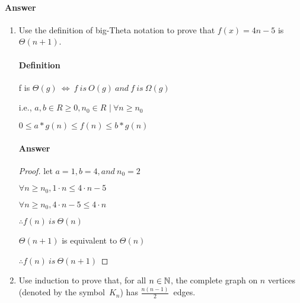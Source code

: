 \documentclass{article}
\begin{document}
\paragraph{Answer}
\todo{}

\collab{\todo{}}

\begin{enumerate}

	\item Use the definition of big-Theta notation to prove that $f(x)=4n-5$
	      is $\Theta(n+1)$.
	      
	      \paragraph{Definition}
	      f is $\Theta(g)\ \iff\ f\ is\ O(g)\ and\ f\ is\ \Omega(g)$
	      
	      i.e., $ a, b \in R \geq 0, n_{0} \in R$
	      $|\ \forall n \geq n_0$
	      
	      $0 \leq a* g(n) \leq f(n) \leq b*g(n)$
	      
	      \paragraph{Answer}
	      \begin{proof}
		      let $a = 1, b = 4, and\ n_0 = 2$
		      
		      $\forall n \geq n_0, 1 \cdot n \leq 4 \cdot n - 5$
		      
		      $\forall n \geq n_0, 4 \cdot n - 5 \leq 4 \cdot n$
		      
		      $\therefore f(n)\ is\ \Theta(n)$
		      
		      $\Theta(n+1)$ is equivalent to $\Theta(n)$
		      
		      $\therefore f(n)\ is\ \Theta(n+1)$
	      \end{proof}
	      
	\item Use induction to prove that, for all $n \in {\mathbb N}$, the complete graph on
	      $n$ vertices (denoted by the symbol~$K_n$) has $\frac{n(n-1)}{2}$~edges.
	      
	      

\end{enumerate}
\end{document}
